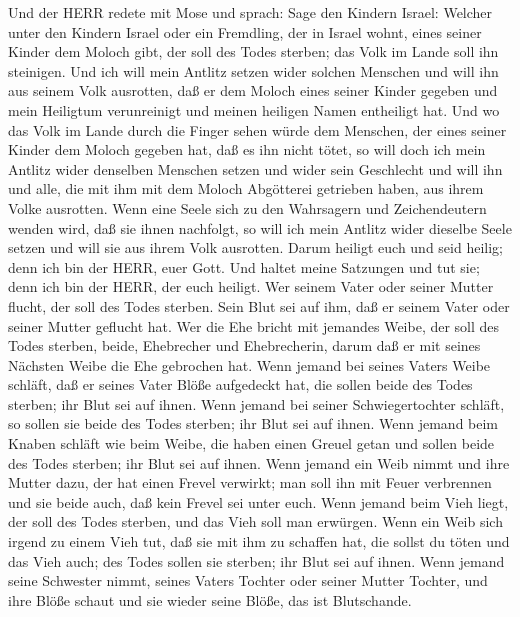 Und der HERR redete mit Mose und sprach:  Sage
den Kindern Israel: Welcher unter den Kindern Israel oder ein Fremdling,
der in Israel wohnt, eines seiner Kinder dem Moloch gibt, der soll des
Todes sterben; das Volk im Lande soll ihn steinigen.  Und
ich will mein Antlitz setzen wider solchen Menschen und will ihn aus
seinem Volk ausrotten, daß er dem Moloch eines seiner Kinder gegeben und
mein Heiligtum verunreinigt und meinen heiligen Namen entheiligt hat.
 Und wo das Volk im Lande durch die Finger sehen würde dem
Menschen, der eines seiner Kinder dem Moloch gegeben hat, daß es ihn
nicht tötet,  so will doch ich mein Antlitz wider denselben
Menschen setzen und wider sein Geschlecht und will ihn und alle, die mit
ihm mit dem Moloch Abgötterei getrieben haben, aus ihrem Volke
ausrotten.  Wenn eine Seele sich zu den Wahrsagern und
Zeichendeutern wenden wird, daß sie ihnen nachfolgt, so will ich mein
Antlitz wider dieselbe Seele setzen und will sie aus ihrem Volk
ausrotten.  Darum heiligt euch und seid heilig; denn ich bin
der HERR, euer Gott.  Und haltet meine Satzungen und tut
sie; denn ich bin der HERR, der euch heiligt.  Wer seinem
Vater oder seiner Mutter flucht, der soll des Todes sterben. Sein Blut
sei auf ihm, daß er seinem Vater oder seiner Mutter geflucht hat.
 Wer die Ehe bricht mit jemandes Weibe, der soll des Todes
sterben, beide, Ehebrecher und Ehebrecherin, darum daß er mit seines
Nächsten Weibe die Ehe gebrochen hat.  Wenn jemand bei
seines Vaters Weibe schläft, daß er seines Vater Blöße aufgedeckt hat,
die sollen beide des Todes sterben; ihr Blut sei auf ihnen.
 Wenn jemand bei seiner Schwiegertochter schläft, so sollen
sie beide des Todes sterben; ihr Blut sei auf ihnen.  Wenn
jemand beim Knaben schläft wie beim Weibe, die haben einen Greuel getan
und sollen beide des Todes sterben; ihr Blut sei auf ihnen.
 Wenn jemand ein Weib nimmt und ihre Mutter dazu, der hat
einen Frevel verwirkt; man soll ihn mit Feuer verbrennen und sie beide
auch, daß kein Frevel sei unter euch.  Wenn jemand beim
Vieh liegt, der soll des Todes sterben, und das Vieh soll man erwürgen.
 Wenn ein Weib sich irgend zu einem Vieh tut, daß sie mit
ihm zu schaffen hat, die sollst du töten und das Vieh auch; des Todes
sollen sie sterben; ihr Blut sei auf ihnen.  Wenn jemand
seine Schwester nimmt, seines Vaters Tochter oder seiner Mutter Tochter,
und ihre Blöße schaut und sie wieder seine Blöße, das ist Blutschande.
